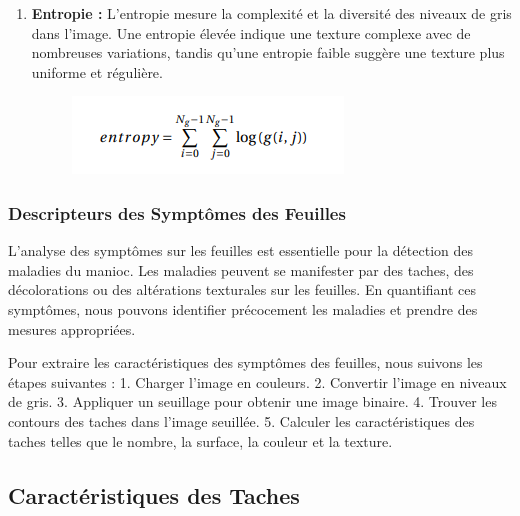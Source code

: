 \documentclass{article}
\begin{document}
\begin{enumerate}
		\item \textbf{Entropie :}
		L'entropie mesure la complexité et la diversité des niveaux de gris dans l'image. Une entropie élevée indique une texture complexe avec de nombreuses variations, tandis qu'une entropie faible suggère une texture plus uniforme et régulière.
		
		\begin{figure}[H]
			\begin{center}
				\begin{minipage}[b]{0.5\textwidth}
					\centering
					\includegraphics[width=\textwidth]{img/entropy.png}
				\end{minipage}
			\end{center}
		\end{figure}
		\end{enumerate}

	\subsubsection{Descripteurs des Symptômes des Feuilles}
	
	L'analyse des symptômes sur les feuilles est essentielle pour la détection des maladies du manioc. Les maladies peuvent se manifester par des taches, des décolorations ou des altérations texturales sur les feuilles. En quantifiant ces symptômes, nous pouvons identifier précocement les maladies et prendre des mesures appropriées.
	
	Pour extraire les caractéristiques des symptômes des feuilles, nous suivons les étapes suivantes :
	1. Charger l'image en couleurs.
	2. Convertir l'image en niveaux de gris.
	3. Appliquer un seuillage pour obtenir une image binaire.
	4. Trouver les contours des taches dans l'image seuillée.
	5. Calculer les caractéristiques des taches telles que le nombre, la surface, la couleur et la texture.
	
	\subsection*{Caractéristiques des Taches}
	
\end{document}
